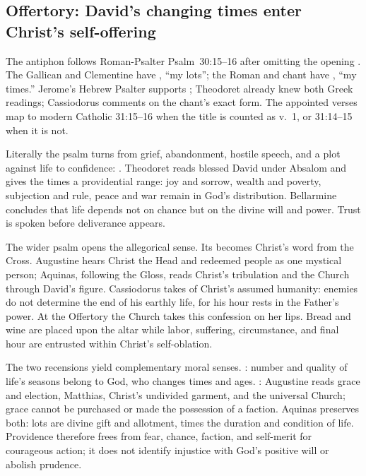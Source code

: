 \subsection*{Offertory: David's changing times enter Christ's self-offering\enspace{}}

The antiphon follows Roman-Psalter Psalm~30:15--16 after omitting the opening
. The Gallican and Clementine have ,
``my lots''; the Roman and chant have , ``my times.'' Jerome's
Hebrew Psalter supports ; Theodoret already knew both Greek
readings; Cassiodorus comments on the chant's exact form. The appointed verses
map to modern Catholic 31:15--16 when the title is counted as v.~1, or
31:14--15 when it is not.

Literally the psalm turns from grief, abandonment, hostile speech, and a plot
against life to confidence: . Theodoret reads blessed
David under Absalom and gives the times a providential range: joy and sorrow,
wealth and poverty, subjection and rule, peace and war remain in God's
distribution. Bellarmine concludes that life depends not on chance but on the
divine will and power. Trust is spoken before deliverance appears.

The wider psalm opens the allegorical sense. Its  becomes Christ's word from the Cross. Augustine hears Christ the
Head and redeemed people as one mystical person; Aquinas, following the Gloss,
reads Christ's tribulation and the Church through David's figure. Cassiodorus takes
 of Christ's assumed humanity: enemies do not determine the end
of his earthly life, for his hour rests in the Father's power. At the Offertory
the Church takes this confession on her lips. Bread and wine are placed upon
the altar while labor, suffering, circumstance, and final hour are entrusted
within Christ's self-oblation.

The two recensions yield complementary moral senses. : number
and quality of life's seasons belong to God, who changes times and ages.
: Augustine reads grace and election, Matthias, Christ's
undivided garment, and the universal Church; grace cannot be purchased or made
the possession of a faction. Aquinas preserves both: lots are divine gift and
allotment, times the duration and condition of life. Providence therefore frees
from fear, chance, faction, and self-merit for courageous action; it does not
identify injustice with God's positive will or abolish prudence.

